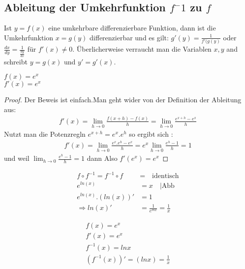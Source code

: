 \subsection{Ableitung der Umkehrfunktion $f^-1$ zu $f$ }
\begin{definition}
Ist $ y = f(x) $ eine umkehrbare differenzierbare Funktion, dann ist die Umkehrfunktion $ x = g(y)$ differenzierbar und es gilt: 
$g'(y)= \frac{1}{f'(g(y)}$ oder $\frac{dx}{dy}= \frac{1}{\frac{dy}{dx}}$ für $f'(x)\neq 0$.
Überlicherweise verraucht man die Variablen $x , y$ and schreibt $y = g(x)$ und $y'=g'(x)$. 
\end{definition}

\begin{example}
$f(x)=e^x$\\
$f'(x)=e^x$\\

\begin{proof}
Der Beweis ist einfach.Man geht wider von der Definition der Ableitung aus:
\begin{align*}
f'(x)= \lim_{h \to 0}{\frac{f(x+h)-f(x)}{h}}= \lim_{h \to 0}{\frac{e^{x+h}-e^x}{h}}
\end{align*}
Nutzt man die Potenzregln $e^{x+h}=e^x.e^h$ so ergibt sich : 
\begin{align*}
f'(x)= \lim_{h \to 0}{\frac{e^x.e^h-e^x}{h}}=e^x \lim_{h \to 0}{\frac{e^h-1}{h}}=1
\end{align*}
und weil $\lim_{h \to 0}{\frac{e^h-1}{h}}=1$ dann Also $f'(e^x)=e^x$
\end{proof}
\end{example}

\begin{remark}
\begin{align*}
f \circ f^{-1} = f^{-1} \circ f &= \quad \text{identisch}\\
e^{ln(x)} &= x \quad | \text{Abb} \\
e^{ln(x)}.(ln(x))' &= 1\\
\Rightarrow ln(x)'&= \frac{1}{e^{lnx}}= \frac{1}{x}
\end{align*}
\end{remark}

\begin{example}
\begin{align*}
f(x)=e^x\\
f'(x)=e^x\\
f^{-1}(x)=lnx\\
(f^{-1}(x))'=(lnx)=\frac{1}{x}
\end{align*}
\end{example}

